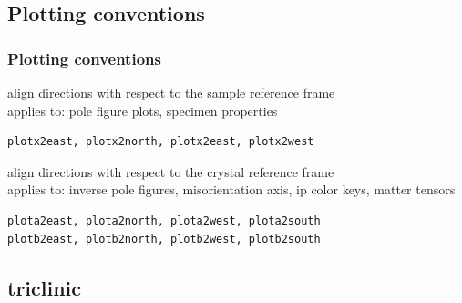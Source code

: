 \documentclass[compress]{beamer}
\begin{document}
\subsection*{Plotting conventions}

\begin{frame}[fragile]
  \frametitle{Plotting conventions}


  align directions with respect to the sample reference frame\\
  applies to: pole figure plots, specimen properties

  \begin{lstlisting}[style=input]
plotx2east, plotx2north, plotx2east, plotx2west
  \end{lstlisting}

  \pause

  \bigskip


  align directions with respect to the crystal reference frame\\
  applies to: inverse pole figures, misorientation axis, ip color keys, matter tensors

    \begin{lstlisting}[style=input]
plota2east, plota2north, plota2west, plota2south
plotb2east, plotb2north, plotb2west, plotb2south
  \end{lstlisting}

\end{frame}


\subsection*{triclinic}
\label{sec:crystal-symmetries}
\end{document}
